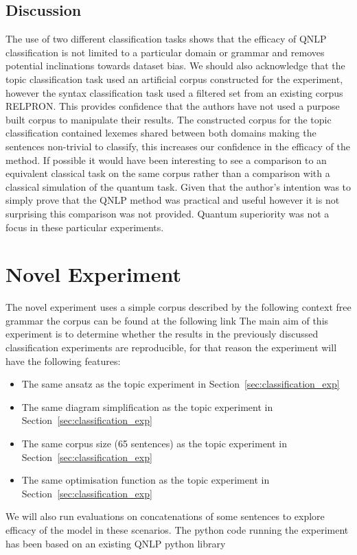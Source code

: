 \documentclass[a4paper,twocolumn,11pt]{quantumarticle}
\begin{document}
    \subsection{Discussion}\label{subsec:discussion}
    The use of two different classification tasks shows that the efficacy of QNLP classification is not limited to a
    particular domain or grammar and removes potential inclinations towards dataset bias.
    We should also acknowledge that the topic classification task used an artificial corpus constructed for the experiment,
    however the syntax classification task used a filtered set from an existing corpus RELPRON\cite{qnlp_in_prac}.
    This provides confidence that the authors have not used a purpose built corpus to manipulate their results.
    The constructed corpus for the topic classification contained lexemes shared between both domains making the
    sentences non-trivial to classify, this increases our confidence in the efficacy of the method.
    \newline
    If possible it would have been interesting to see a comparison to an equivalent classical task on the same corpus
    rather than a comparison with a classical simulation of the quantum task.
    Given that the author's intention was to simply prove that the QNLP method was practical and useful however it is
    not surprising this comparison was not provided.
    Quantum superiority was not a focus in these particular experiments.
    \section{Novel Experiment}\label{sec:novel_exp}
    The novel experiment uses a simple corpus described by the following context free grammar
    the corpus can be found at the following link
    The main aim of this experiment is to determine whether the results in the previously discussed classification
    experiments are reproducible, for that reason the experiment will have the following features:
    \begin{itemize}
        \item The same ansatz as the topic experiment in Section~\ref{sec:classification_exp}
        \item The same diagram simplification as the topic experiment in Section~\ref{sec:classification_exp}
        \item The same corpus size (65 sentences) as the topic experiment in Section~\ref{sec:classification_exp}
        \item The same optimisation function as the topic experiment in Section~\ref{sec:classification_exp}
    \end{itemize}
    We will also run evaluations on concatenations of some sentences to explore efficacy of the model in these scenarios.
    The python code running the experiment has been based on an existing QNLP python library\cite{python-lib}
\end{document}
